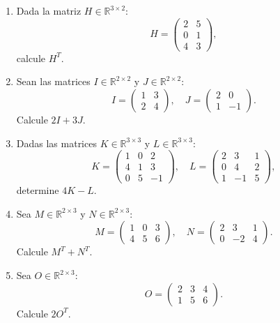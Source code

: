 \documentclass{article}
\begin{document}
\begin{enumerate}
\item Dada la matriz \( H \in \mathbb{R}^{3 \times 2} \):
\[
H = \begin{pmatrix} 2 & 5 \\ 0 & 1 \\ 4 & 3 \end{pmatrix},
\]
calcule \( H^T \).



\item 
Sean las matrices \( I \in \mathbb{R}^{2 \times 2} \) y \( J \in \mathbb{R}^{2 \times 2} \):
\[
I = \begin{pmatrix} 1 & 3 \\ 2 & 4 \end{pmatrix}, \quad J = \begin{pmatrix} 2 & 0 \\ 1 & -1 \end{pmatrix}.
\]
Calcule \( 2I + 3J \).


\item Dadas las matrices \( K \in \mathbb{R}^{3 \times 3} \) y \( L \in \mathbb{R}^{3 \times 3} \):
\[
K = \begin{pmatrix} 1 & 0 & 2 \\ 4 & 1 & 3 \\ 0 & 5 & -1 \end{pmatrix}, \quad L = \begin{pmatrix} 2 & 3 & 1 \\ 0 & 4 & 2 \\ 1 & -1 & 5 \end{pmatrix},
\]
determine \( 4K - L \).


\item Sea \( M \in \mathbb{R}^{2 \times 3} \) y \( N \in \mathbb{R}^{2 \times 3} \):
\[
M = \begin{pmatrix} 1 & 0 & 3 \\ 4 & 5 & 6 \end{pmatrix}, \quad N = \begin{pmatrix} 2 & 3 & 1 \\ 0 & -2 & 4 \end{pmatrix}.
\]
Calcule \( M^T + N^T \).



 \item Sea \( O \in \mathbb{R}^{2 \times 3} \):
\[
O = \begin{pmatrix} 2 & 3 & 4 \\ 1 & 5 & 6 \end{pmatrix}.
\]
Calcule \( 2O^T \).

\end{enumerate}
\end{document}
